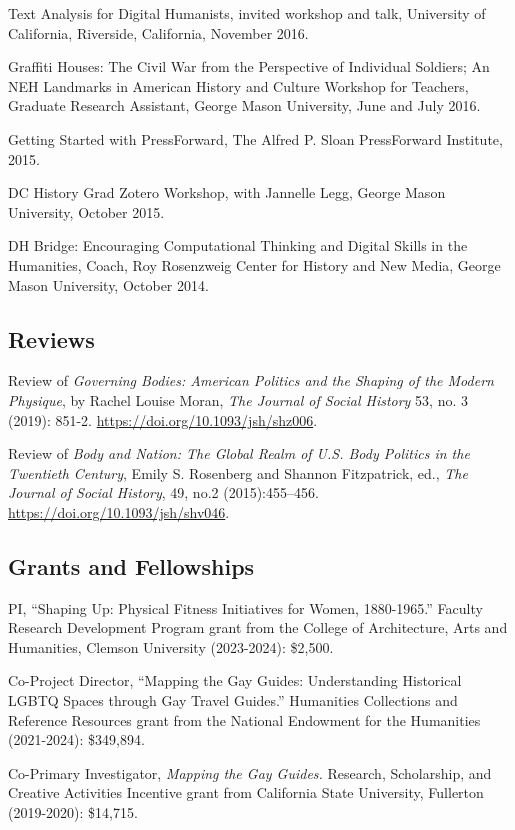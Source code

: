 \documentclass[11pt]{article}
\begin{document}
Text Analysis for Digital Humanists, invited workshop and talk, University of California, Riverside, California, November 2016.

Graffiti Houses: The Civil War from the Perspective of Individual Soldiers; An NEH Landmarks in American History and Culture Workshop for Teachers, Graduate Research Assistant, George Mason University, June and July 2016.

Getting Started with PressForward, The Alfred P. Sloan PressForward Institute, 2015.

DC History Grad Zotero Workshop, with Jannelle Legg, George Mason University, October 2015.

DH Bridge: Encouraging Computational Thinking and Digital Skills in the Humanities, Coach, Roy Rosenzweig Center for History and New Media, George Mason University, October 2014.

\subsection{Reviews}\label{reviews}

Review of \emph{Governing Bodies: American Politics and the Shaping of the Modern Physique}, by Rachel Louise Moran, \emph{The Journal of Social History} 53, no. 3 (2019): 851-2. \url{https://doi.org/10.1093/jsh/shz006}.

Review of \emph{Body and Nation: The Global Realm of U.S. Body Politics in the Twentieth Century}, Emily S. Rosenberg and Shannon Fitzpatrick, ed., \emph{The Journal of Social History}, 49, no.2 (2015):455–456. \url{https://doi.org/10.1093/jsh/shv046}.

\subsection{Grants and Fellowships}
PI, ``Shaping Up: Physical Fitness Initiatives for Women, 1880-1965.'' Faculty Research Development Program grant from the College of Architecture, Arts and Humanities, Clemson University (2023-2024): \$2,500.

Co-Project Director, ``Mapping the Gay Guides: Understanding Historical LGBTQ Spaces through Gay Travel Guides.'' Humanities Collections and Reference Resources grant from the National Endowment for the Humanities (2021-2024): \$349,894.

Co-Primary Investigator, \emph{Mapping the Gay Guides.} Research, Scholarship, and Creative Activities Incentive grant from California State University, Fullerton (2019-2020): \$14,715.
\end{document}
